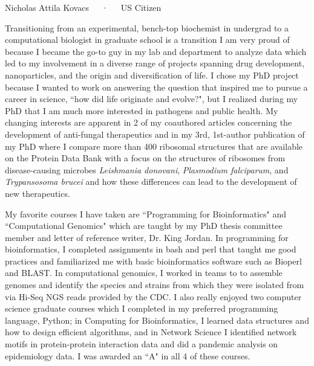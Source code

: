 \documentclass[11pt, letterpaper]{CV_latex_class}
\begin{document}
\makecvheader

\makecvfooter
  {Nicholas Attila Kovacs~~~·~~~US Citizen}

\makelettertitle

\begin{cvletter}


\hspace{1em} Transitioning from an experimental, bench-top biochemist in undergrad to a computational biologist in graduate school is a transition I am very proud of because I became the go-to guy in my lab and department to analyze data which led to my involvement in a diverse range of projects spanning drug development, nanoparticles, and the origin and diversification of life. I chose my PhD project because I wanted to work on answering the question that inspired me to pursue a career in science, ``how did life originate and evolve?", but I realized during my PhD that I am much more interested in pathogens and public health. My changing interests are apparent in 2 of my coauthored articles concerning the development of anti-fungal therapeutics and in my 3rd, 1st-author publication of my PhD where I compare more than 400 ribosomal structures that are available on the Protein Data Bank with a focus on the structures of ribosomes from disease-causing microbes \textit{Leishmania donovani}, \textit{Plasmodium falciparum}, and \textit{Trypansosoma brucei} and how these differences can lead to the development of new therapeutics.

\hspace{1em}My favorite courses I have taken are ``Programming for Bioinformatics" and ``Computational Genomics" which are taught by my PhD thesis committee member and letter of reference writer, Dr. King Jordan. In programming for bioinformatics, I completed assignments in bash and perl that taught me good practices and familiarized me with basic bioinformatics software such as Bioperl and BLAST. In computational genomics, I worked in teams to to assemble genomes and identify the species and strains from which they were isolated from via Hi-Seq NGS reads provided by the CDC. I also really enjoyed two computer science graduate courses which I completed in my preferred programming language, Python; in Computing for Bioinformatics, I learned data structures and how to design efficient algorithms, and in Network Science I identified network motifs in protein-protein interaction data and did a pandemic analysis on epidemiology data. I was awarded an ``A" in all 4 of these courses.  


\end{cvletter}
\end{document}
